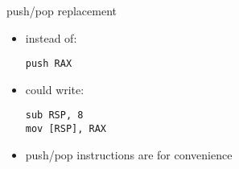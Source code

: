\begin{frame}[fragile,label=pushPopRepl]{push/pop replacement}
\lstset{language=myasm}
\begin{itemize}
\item instead of:
\begin{lstlisting}
push RAX
\end{lstlisting}
\item could write:
\begin{lstlisting}
sub RSP, 8
mov [RSP], RAX
\end{lstlisting}
\vspace{.5cm}
\item push/pop instructions are for convenience
\end{itemize}
\end{frame}
